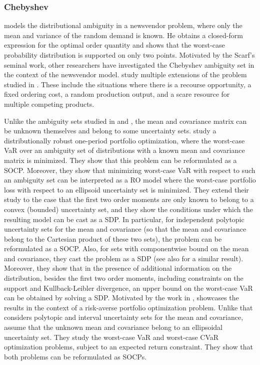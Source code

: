 \documentclass[final,onefignum,onetabnum]{class}
\begin{document}
\subsubsection{Chebyshev}
\label{sec: rev.Chebyshev}


\citet{scarf1958} models the distributional ambiguity in a \linebreak newsvendor problem, where only the mean and variance of the random demand is known. He obtains a closed-form expression for the optimal order quantity and shows that the worst-case probability distribution is supported on only two points. 
Motivated by the Scarf's seminal work, other researchers have investigated the Chebyshev ambiguity set in the context of the newsvendor model. 
\citet{gallego1993} study multiple extensions of the problem studied in \citet{scarf1958}. These include the situations where there is a recourse opportunity, a fixed ordering cost, a random production output,  and a scare resource for multiple competing products.

Unlike the ambiguity sets studied in \citet{scarf1958} and \citet{gallego1993}, the mean and covariance matrix can be unknown themselves and belong to some uncertainty sets.  
\citet{ghaoui2003worst} study a distributionally robust one-period portfolio optimization, where the worst-case VaR  over an ambiguity set of distributions with a known mean and covariance matrix is minimized. They show that this problem can be reformulated as a SOCP. Moreover, they show that minimizing worst-case VaR with respect to such an ambiguity set can be interpreted as a RO model where the worst-case portfolio loss with respect to an ellipsoid uncertainty set is minimized. 
They extend their study to the case that the first two order moments are only known to belong to a convex (bounded) uncertainty set, and they show the conditions under which the resulting model can be cast as  a SDP. In particular, for  independent polytopic uncertainty sets for the mean and covariance (so that the mean and covariance belong to the Cartesian product of these two sets), the problem can be reformulated as a SOCP. Also, for sets with componentwise bound on the mean and covariance, they cast the problem as a SDP (see also \citet{halldorsson2003} for a similar result). Moreover, they show that in the presence of  additional  information on the distribution, besides the first two order moments, including  constraints on the support and Kullback-Leibler divergence, an upper bound on the worst-case VaR can be obtained by solving a SDP. 
Motivated by the work in \citet{ghaoui2003worst}, \citet{li2016law}  showcases the results in the context of a risk-averse portfolio optimization problem.  
Unlike \citet{ghaoui2003worst} that considers polytopic and interval uncertainty sets for the mean and covariance, \citet{lotfi2018} assume that the unknown mean and covariance belong to an ellipsoidal uncertainty set. They study the worst-case VaR and worst-case CVaR optimization problems, subject to an expected return constraint. %
They show that both problems can be reformulated as  SOCPs. 
\end{document}
